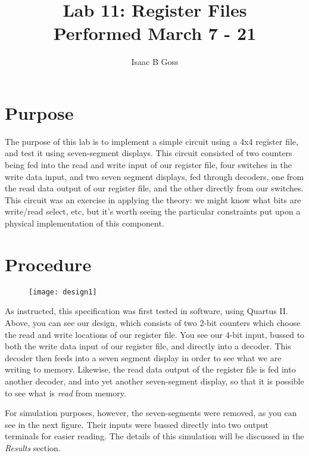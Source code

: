 \documentclass[titlepage]{article}
\author{Isaac B Goss}
\title{Lab 11: Register Files\\Performed March 7 - 21}
\begin{document}
	\begin{titlepage}
	    \maketitle
	\end{titlepage}

    \section{Purpose}
        The purpose of this lab is to implement a simple circuit using a 4x4 register file, and test it using seven-segment displays.
        This circuit consisted of two counters being fed into the read and write input of our register file, four switches in the write data input, and two seven segment displays, fed through decoders, one from the read data output of our register file, and the other directly from our switches.
        This circuit was an exercise in applying the theory: we might know what bits are write/read select, etc, but it's worth seeing the particular constraints put upon a physical implementation of this component.
        
    \section{Procedure}
    
        \begin{figure}[h]
        	\centering
        	\texttt{[image: design1]}
        \end{figure}
        
        As instructed, this specification was first tested in software, using Quartus II.
        Above, you can see our design, which consists of two 2-bit counters which choose the read and write locations of our register file.
        You see our 4-bit input, bussed to both the write data input of our register file, and directly into a decoder.
        This decoder then feeds into a seven segment display in order to see what we are writing to memory.
        Likewise, the read data output of the register file is fed into another decoder, and into yet another seven-segment display, so that it is possible to see what is \textit{read} from memory.
        
        For simulation purposes, however, the seven-segments were removed, as you can see in the next figure.  Their inputs were bussed directly into two output terminals for easier reading. 
        The details of this simulation will be discussed in the \textit{Results} section.
        
\end{document}
